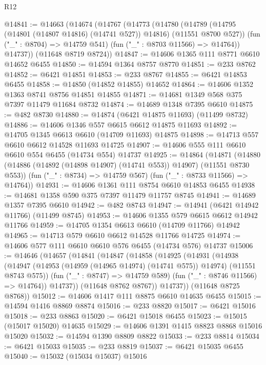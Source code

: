 \begin{lexlean}{R12}
\begin{coremodule}
{{{{{{{{{{{{{{{{{{{{{{{{{{{{{{{{{{{{{{{{{{{{{{{{{{{{{{{{{{{{{{{{{{{{{{{{{{{{{{{{{{@14841 := @14663
    (@14674
      (@14767
        (@14773
          (@14780
            (@14789 (@14795 (@14801 (@14807 @14816) (@14741 @527)) @14816) (@11551 @8700 @527))
            (fun ("_" : @8704) => @14759 @541)
            (fun ("_" : @8703 @11566) => @14764))
          @14737))
      (@11648 @8719 @8724))
@14847 := @14606 @1365 @111 @8771 @6610 @14652 @6455
@14850 := @14594 @1364 @8757 @8770
@14851 := @233 @8762
@14852 := @6421 @14851
@14853 := @233 @8767
@14855 := @6421 @14853 @6455
@14858 := @14850 (@14852 @14855) @14652
@14864 := @14606 @1352 @1363 @8741 @8756 @14851 @14855
@14871 := @14681 @1349 @568 @375 @7397 @11479 @11684 @8732
@14874 := @14689 @1348 @7395 @6610
@14875 := @482 @8730
@14880 := @14874 (@6421 @14875 @11693) (@11499 @8732)
@14886 := @14606 @1346 @557 @6615 @6612 @14875 @11693
@14892 := @14705 @1345 @6613 @6610 (@14709 @11693) @14875
@14898 := @14713 @557 @6610 @6612 @14528 @11693 @14725
@14907 := @14606 @555 @111 @6610 @6610 @554 @6455 (@14734 @554) @14737
@14925 := @14864
    (@14871
      (@14880 (@14886 (@14892 (@14898 @14907) (@14741 @553)) @14907) (@11551 @8730 @553))
      (fun ("_" : @8734) => @14759 @567)
      (fun ("_" : @8733 @11566) => @14764))
@14931 := @14606 @1361 @111 @8754 @6610 @14853 @6455
@14938 := @14681 @1358 @590 @375 @7397 @11479 @11757 @8745
@14941 := @14689 @1357 @7395 @6610
@14942 := @482 @8743
@14947 := @14941 (@6421 @14942 @11766) (@11499 @8745)
@14953 := @14606 @1355 @579 @6615 @6612 @14942 @11766
@14959 := @14705 @1354 @6613 @6610 (@14709 @11766) @14942
@14965 := @14713 @579 @6610 @6612 @14528 @11766 @14725
@14974 := @14606 @577 @111 @6610 @6610 @576 @6455 (@14734 @576) @14737
@15006 := @14646
    (@14657
      (@14841
        (@14847
          (@14858
            (@14925
              (@14931
                (@14938
                  (@14947
                    (@14953 (@14959 (@14965 @14974) (@14741 @575)) @14974)
                    (@11551 @8743 @575))
                  (fun ("_" : @8747) => @14759 @589)
                  (fun ("_" : @8746 @11566) => @14764))
                @14737))
            (@11648 @8762 @8767))
          @14737))
      (@11648 @8725 @8768))
@15012 := @14606 @1417 @111 @8875 @6610 @14635 @6455
@15015 := @14594 @1416 @8869 @8874
@15016 := @233 @8820
@15017 := @6421 @15016
@15018 := @233 @8863
@15020 := @6421 @15018 @6455
@15023 := @15015 (@15017 @15020) @14635
@15029 := @14606 @1391 @1415 @8823 @8868 @15016 @15020
@15032 := @14594 @1390 @8809 @8822
@15033 := @233 @8814
@15034 := @6421 @15033
@15035 := @233 @8819
@15037 := @6421 @15035 @6455
@15040 := @15032 (@15034 @15037) @15016
}}}}}}}}}}}}}}}}}}}}}}}}}}}}}}}}}}}}}}}}}}}}}}}}}}}}}}}}}}}}}}}}}}}}}}}}}}}}}}}}}}
\end{coremodule}
\end{lexlean}
